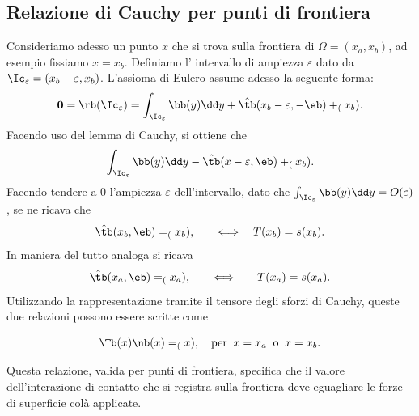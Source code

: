 \subsection{Relazione di Cauchy per punti di frontiera}
Consideriamo adesso un punto $x$ che si trova sulla frontiera di $\Omega=(x_a, x_b)$, ad esempio fissiamo $x=x_b$. Definiamo l' intervallo di ampiezza $\varepsilon$ dato da $\Ic_\varepsilon=(x_b-\varepsilon, x_b)$. L'assioma di Eulero assume adesso la seguente forma:
\begin{equation}
\mathbf{0}=\rb(\Ic_\varepsilon)=\int_{\Ic_\varepsilon}\bb(y)\dd y+\hat\tb(x_b-\varepsilon,-\eb)+\sb(x_b).
\end{equation}
Facendo uso del lemma di Cauchy, si ottiene che
\begin{equation}
\int_{\Ic_\varepsilon}\bb(y)\dd y-\hat\tb(x-\varepsilon,\eb)+\sb(x_b).
\end{equation}
Facendo tendere a 0 l'ampiezza $\varepsilon$ dell'intervallo, dato che $\int_{\Ic_\varepsilon}\bb(y)\dd y=O(\varepsilon)$, se ne ricava che
\begin{equation}
\hat\tb(x_b,\eb)=\sb(x_b), \qquad \Longleftrightarrow\quad T(x_b)=s(x_b).
\end{equation}
In maniera del tutto analoga si ricava
\begin{equation}
	\hat\tb(x_a,\eb)=\sb(x_a), \qquad \Longleftrightarrow \quad -T(x_a)=s(x_a).
\end{equation}
Utilizzando la rappresentazione tramite il tensore degli sforzi di Cauchy, queste due relazioni possono essere scritte come
\begin{definition}
	\begin{equation}
\Tb(x)\nb(x)=\sb(x), \quad \textrm{per} \;\; x=x_a \;\;\textrm{o} \;\;  x=x_b.
\end{equation}
\end{definition}
Questa relazione, valida per punti di frontiera, specifica che il valore dell'interazione di contatto che si registra sulla frontiera deve eguagliare le forze di superficie colà applicate.

